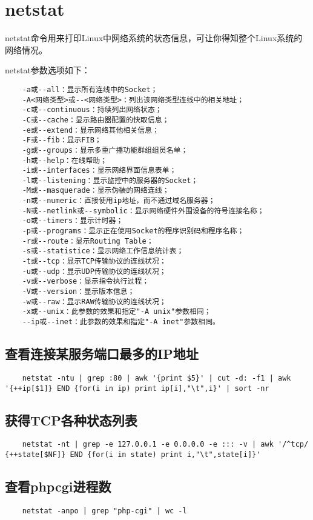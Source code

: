 \documentclass[a4paper,left=2.5cm,right=2.5cm,11pt]{article}
\begin{document}
\section{netstat}
	netstat命令用来打印Linux中网络系统的状态信息，可让你得知整个Linux系统的网络情况。\par

	netstat参数选项如下：
	\begin{lstlisting}
	-a或--all：显示所有连线中的Socket； 
	-A<网络类型>或--<网络类型>：列出该网络类型连线中的相关地址； 
	-c或--continuous：持续列出网络状态； 
	-C或--cache：显示路由器配置的快取信息； 
	-e或--extend：显示网络其他相关信息； 
	-F或--fib：显示FIB； 
	-g或--groups：显示多重广播功能群组组员名单； 
	-h或--help：在线帮助； 
	-i或--interfaces：显示网络界面信息表单； 
	-l或--listening：显示监控中的服务器的Socket； 
	-M或--masquerade：显示伪装的网络连线； 
	-n或--numeric：直接使用ip地址，而不通过域名服务器； 
	-N或--netlink或--symbolic：显示网络硬件外围设备的符号连接名称； 
	-o或--timers：显示计时器； 
	-p或--programs：显示正在使用Socket的程序识别码和程序名称； 
	-r或--route：显示Routing Table； 
	-s或--statistice：显示网络工作信息统计表； 
	-t或--tcp：显示TCP传输协议的连线状况； 
	-u或--udp：显示UDP传输协议的连线状况； 
	-v或--verbose：显示指令执行过程； 
	-V或--version：显示版本信息； 
	-w或--raw：显示RAW传输协议的连线状况； 
	-x或--unix：此参数的效果和指定"-A unix"参数相同； 
	--ip或--inet：此参数的效果和指定"-A inet"参数相同。
	\end{lstlisting}

	

\subsection{查看连接某服务端口最多的IP地址}
	\begin{lstlisting}
	netstat -ntu | grep :80 | awk '{print $5}' | cut -d: -f1 | awk '{++ip[$1]} END {for(i in ip) print ip[i],"\t",i}' | sort -nr
	\end{lstlisting}

\subsection{获得TCP各种状态列表}
	\begin{lstlisting}
	netstat -nt | grep -e 127.0.0.1 -e 0.0.0.0 -e ::: -v | awk '/^tcp/ {++state[$NF]} END {for(i in state) print i,"\t",state[i]}'
	\end{lstlisting}

\subsection{查看phpcgi进程数}
	\begin{lstlisting}
	netstat -anpo | grep "php-cgi" | wc -l
	\end{lstlisting}
\end{document}
